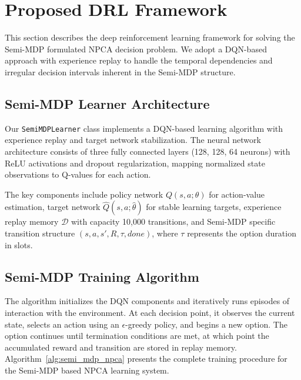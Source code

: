 \documentclass[conference]{IEEEtran}
\begin{document}
\section{Proposed DRL Framework}

This section describes the deep reinforcement learning framework for solving the Semi-MDP formulated NPCA decision problem. We adopt a DQN-based approach with experience replay to handle the temporal dependencies and irregular decision intervals inherent in the Semi-MDP structure.

\subsection{Semi-MDP Learner Architecture}

Our \texttt{SemiMDPLearner} class implements a DQN-based learning algorithm with experience replay and target network stabilization. The neural network architecture consists of three fully connected layers (128, 128, 64 neurons) with ReLU activations and dropout regularization, mapping normalized state observations to Q-values for each action.

The key components include policy network $Q(s,a;\theta)$ for action-value estimation, target network $\hat{Q}(s,a;\hat{\theta})$ for stable learning targets, experience replay memory $\mathcal{D}$ with capacity 10,000 transitions, and Semi-MDP specific transition structure $(s, a, s', R, \tau, done)$, where $\tau$ represents the option duration in slots.

\subsection{Semi-MDP Training Algorithm}

The algorithm initializes the DQN components and iteratively runs episodes of interaction with the environment. At each decision point, it observes the current state, selects an action using an $\epsilon$-greedy policy, and begins a new option. The option continues until termination conditions are met, at which point the accumulated reward and transition are stored in replay memory. Algorithm~\ref{alg:semi_mdp_npca} presents the complete training procedure for the Semi-MDP based NPCA learning system.
\end{document}
